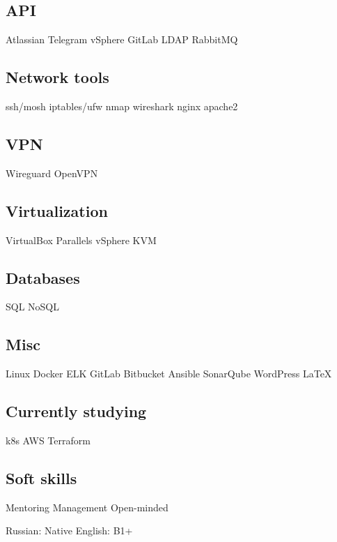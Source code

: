 \documentclass[a4paper]{MagicalCV}
\begin{document}
\begin{minipage}[t]{0.33\textwidth}
\subsection{API}
Atlassian \textbullet{} Telegram \textbullet{} vSphere \textbullet{}
GitLab \textbullet{} LDAP \textbullet{} RabbitMQ
\subsection{Network tools}
ssh/mosh \textbullet{} iptables/ufw \textbullet{} nmap \textbullet{}
wireshark \textbullet{} nginx \textbullet{} apache2
\subsection{VPN}
Wireguard \textbullet{} OpenVPN
\subsection{Virtualization}
VirtualBox \textbullet{} Parallels \textbullet{} vSphere \textbullet{} KVM
\subsection{Databases}
SQL \textbullet{} NoSQL
\subsection{Misc}
Linux \textbullet{} Docker \textbullet{} ELK \textbullet{} GitLab \textbullet{}
Bitbucket \textbullet{} Ansible \textbullet{} SonarQube \textbullet {}
WordPress \textbullet{} \LaTeX
\subsection{Currently studying}
k8s \textbullet{} AWS \textbullet{} Terraform
\subsection{Soft skills}
Mentoring \textbullet{} Management \textbullet{} Open-minded
\sectionsep


Russian: Native \textbullet{} English: B1+
\sectionsep

\end{minipage} 
\hfill
\end{document}
